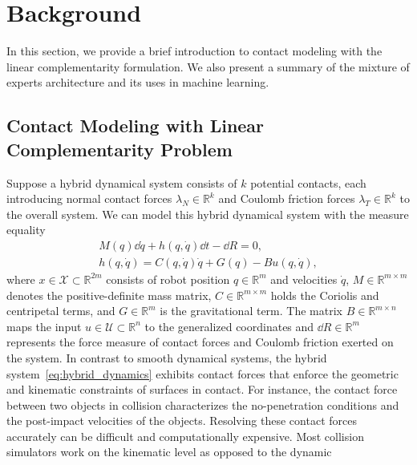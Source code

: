 
\section{Background}

In this section, we provide a brief introduction to contact modeling with the
linear complementarity formulation.
%
We also present a summary of the mixture of experts architecture and
its uses in machine learning.

\subsection{Contact Modeling with Linear Complementarity Problem}

Suppose a hybrid dynamical system consists of $k$ potential contacts, each
introducing normal contact forces $\lambda_N \in \mathbb{R}^{k}$ and Coulomb
friction forces $\lambda_T \in \mathbb{R}^{k}$ to the overall system.
%
We can model this hybrid dynamical system with the measure
equality~\cite{glocker2005formulation}
\begin{equation}
  \begin{gathered}
    M(q) \dd \dot{q} + h(q, \dot{q})\dd t - \dd R  = 0, \\
    h(q, \dot{q}) = C(q, \dot{q})\dot{q} + G(q) - Bu(q, \dot{q}), 
  \end{gathered}
  \label{eq:hybrid_dynamics}
\end{equation}
%
\noindent where $x \in \mathcal{X} \subset \mathbb{R}^{2m}$ consists of robot
position $q \in \mathbb{R}^m$ and velocities $\dot{q}$, $M \in \mathbb{R}^{m
\times m}$ denotes the positive-definite mass matrix, $C \in \mathbb{R}^{m
\times m}$ holds the Coriolis and centripetal terms, and $G \in \mathbb{R}^{m}$
is the gravitational term. The matrix $B \in \mathbb{R}^{m \times n}$ maps the
input $u \in \mathcal{U} \subset \mathbb{R}^{n}$ to the generalized coordinates
and $\dd R \in \mathbb{R}^m$ represents the force measure of contact forces and
Coulomb friction exerted on the system. 
%
In contrast to smooth dynamical systems, the hybrid
system~\eqref{eq:hybrid_dynamics} exhibits contact forces that enforce
the geometric and kinematic constraints of surfaces in contact.
%
For instance, the contact force between two objects in collision characterizes
the no-penetration conditions and the post-impact velocities of the objects.
%
Resolving these contact forces accurately can be difficult and computationally
expensive.
%
Most collision simulators work on the kinematic level as opposed to the dynamic
